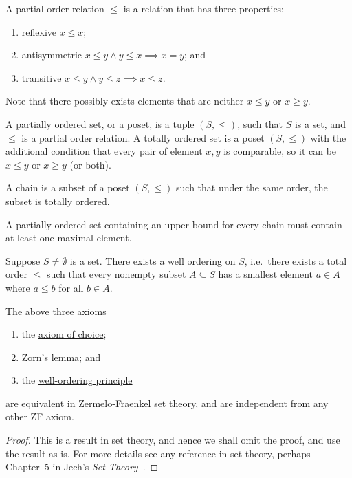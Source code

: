 \begin{definition}
    A partial order relation \(\leq\) is a relation that has three properties:
    \begin{enumerate}[label={(\roman*)}, itemsep=0mm]
        \item reflexive \(x \leq x\);
        \item antisymmetric \(x \leq y \land y \leq x \implies x = y\); and
        \item transitive \(x \leq y \land y \leq z \implies x \leq z\).
    \end{enumerate}
    Note that there possibly exists elements
    that are neither \(x \leq y\) or \(x \geq y\).
\end{definition}
\begin{definition}
    A partially ordered set, or a poset,
    is a tuple \((S,\leq)\),
    such that \(S\) is a set,
    and \(\leq\) is a partial order relation.
    A totally ordered set is a poset \((S,\leq)\)
    with the additional condition that every pair of element \(x,y\) is comparable,
    so it can be \(x \leq y\) or \(x \geq y\) (or both).
\end{definition}
\begin{definition}
    A chain is a subset of a poset \((S,\leq)\)
    such that under the same order, the subset is totally ordered.
\end{definition}
\begin{axiom}\label{ax:zorn}
    A partially ordered set containing an upper bound for every chain
    must contain at least one maximal element.
\end{axiom}

\begin{axiom}\label{ax:well-order}
    Suppose \(S \neq \emptyset\) is a set.
    There exists a well ordering on \(S\),
    i.e.\ there exists a total order \(\leq\)
    such that every nonempty subset \(A \subseteq S\)
    has a smallest element \(a \in A\) where \(a \leq b\) for all \(b \in A\).
\end{axiom}

\begin{theorem}
    The above three axioms
    \begin{enumerate}[label={(\alph*)}, itemsep=0mm]
        \item the \hyperref[ax:choice]{axiom of choice};
        \item \hyperref[ax:zorn]{Zorn's lemma}; and
        \item the \hyperref[ax:well-order]{well-ordering principle}
    \end{enumerate}
    are equivalent in Zermelo-Fraenkel set theory,
    and are independent from any other ZF axiom.
\end{theorem}
\begin{proof}
    This is a result in set theory, and hence we shall omit the proof,
    and use the result as is.
    For more details see any reference in set theory,
    perhaps Chapter~5 in Jech's \textit{Set Theory}~\cite{jech}.
\end{proof}


